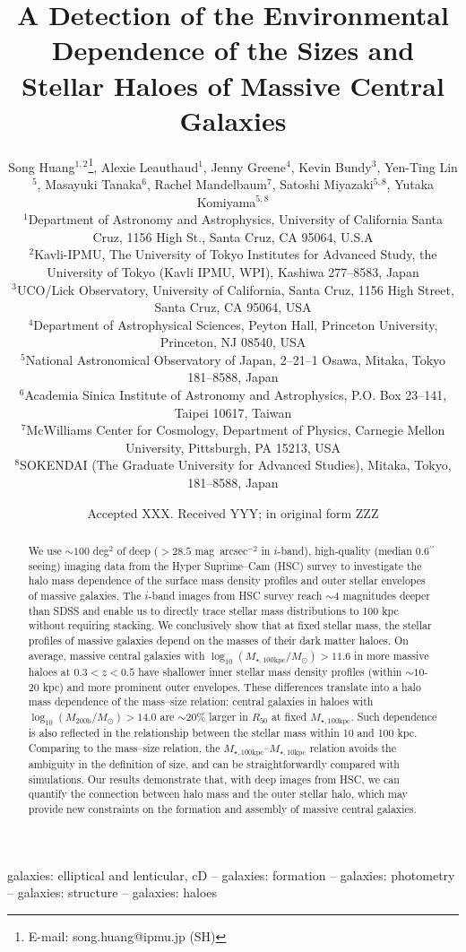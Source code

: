\documentclass[a4paper,fleqn,usenatbib]{mnras}
\title[Structure and Environment of Massive Galaxies]{
       A Detection of the Environmental Dependence of the Sizes and Stellar Haloes
       of Massive Central Galaxies}
\author[S. Huang et al.]{
        Song Huang$^{1,2}$\thanks{E-mail: song.huang@ipmu.jp (SH)},
        Alexie Leauthaud$^{1}$,
        Jenny Greene$^{4}$,
        Kevin Bundy$^{3}$,
        \newauthor
        Yen-Ting Lin$^{5}$,
        Masayuki Tanaka$^{6}$,
        Rachel Mandelbaum$^{7}$,
        Satoshi Miyazaki$^{5,8}$,
        \newauthor
        Yutaka Komiyama$^{5,8}$
        \\
        $^{1}$Department of Astronomy and Astrophysics, University of California 
              Santa Cruz, 1156 High St., Santa Cruz, CA 95064, U.S.A\\
        $^{2}$Kavli-IPMU, The University of Tokyo Institutes for Advanced Study, 
              the University of Tokyo (Kavli IPMU, WPI), Kashiwa 277--8583, Japan\\              
        $^{3}$UCO/Lick Observatory, University of California, Santa Cruz,
              1156 High Street, Santa Cruz, CA 95064, USA\\
        $^{4}$Department of Astrophysical Sciences, Peyton Hall,
              Princeton University, Princeton, NJ 08540, USA \\
        $^{5}$National Astronomical Observatory of Japan, 2--21--1 Osawa, Mitaka, 
              Tokyo 181--8588, Japan\\
        $^{6}$Academia Sinica Institute of Astronomy and Astrophysics, 
              P.O. Box 23--141, Taipei 10617, Taiwan\\
        $^{7}$McWilliams Center for Cosmology, Department of Physics, 
              Carnegie Mellon University, Pittsburgh, PA 15213, USA\\
        $^{8}$SOKENDAI (The Graduate University for Advanced Studies), Mitaka,
              Tokyo, 181--8588, Japan
        }
\date{Accepted XXX. Received YYY; in original form ZZZ}
\def\asec{$^{\prime\prime}$}
\def\sb{mag~arcsec$^{-2}$}
\def\logmh{{$\log_{10} (M_{\mathrm{200b}}/M_{\odot})$}}
\def\minn{{$M_{\star,10\mathrm{kpc}}$}}
\def\mtot{{$M_{\star,100\mathrm{kpc}}$}}
\def\logmtot{{$\log_{10} (M_{\star,100\mathrm{kpc}}/M_{\odot})$}}
\begin{document}
\label{firstpage}
\pagerange{\pageref{firstpage}--\pageref{lastpage}}

\maketitle


\begin{abstract}  

    We use ${\sim}100$ deg$^2$ of deep ($>28.5$ \sb{} in $i$-band), high-quality 
    (median 0.6\asec seeing) imaging data from the Hyper Suprime--Cam (HSC) survey 
    to investigate the halo mass dependence of the surface mass density profiles 
    and outer stellar envelopes of massive galaxies. 
    The $i$-band images from HSC survey reach ${\sim}4$ magnitudes deeper than SDSS 
    and enable us to directly trace stellar mass distributions to 100 kpc without 
    requiring stacking.  
    We conclusively show that at fixed stellar mass, the stellar profiles of massive 
    galaxies depend on the masses of their dark matter haloes. 
    On average, massive central galaxies with \logmtot{}$>11.6$ in more massive haloes 
    at $0.3 < z < 0.5$ have shallower inner stellar mass density profiles 
    (within ${\sim}10$-$20$ kpc) and more prominent outer envelopes. 
    These differences translate into a halo mass dependence of the 
    mass--size relation: central galaxies in haloes with \logmh{}$>14.0$ are 
    $\sim 20$\% larger in $R_{\mathrm{50}}$ at fixed \mtot{}.  
    Such dependence is also reflected in the relationship between the stellar mass 
    within 10 and 100 kpc. 
    Comparing to the mass--size relation, the \mtot{}--\minn{} relation avoids the 
    ambiguity in the definition of size, and can be straightforwardly compared with 
    simulations. 
    Our results demonstrate that, with deep images from HSC, we can quantify the 
    connection between halo mass and the outer stellar halo, which may provide new 
    constraints on the formation and assembly of massive central galaxies.
    
\end{abstract}

\begin{keywords}
    galaxies: elliptical and lenticular, cD --
    galaxies: formation --
    galaxies: photometry -- 
    galaxies: structure -- 
    galaxies: haloes
\end{keywords}
\end{document}
